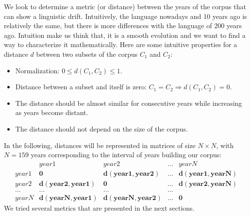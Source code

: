 We look to determine a metric (or distance) between the years of the corpus that can show a linguistic drift. Intuitively, the language nowadays and 10 years ago is relatively the same, but there is more differences with the language of 200 years ago. Intuition make us think that, it is a smooth evolution and we want to find a way to characterize it mathematically. Here are some intuitive properties for a distance $d$ between two subsets of the corpus $C_1$ and $C_2$:

\begin{itemize}
 \item Normalization: $0 \leq d(C_1,C_2) \leq 1$.
 \item Distance between a subset and itself is zero: $C_1 = C_2 \Rightarrow d(C_1,C_2) = 0$.
 \item The distance should be almost similar for consecutive years while increasing as years become distant.
 \item The distance should not depend on the size of the corpus.
\end{itemize}

In the following, distances will be represented in matrices of size $N \times N$, with $N = 159$ years corresponding to the interval of years building our corpus:
\[
\begin{matrix}
 & year1 & year2 & ... & yearN \\
 year1 & \mathbf{0} & \mathbf{d(year1,year2)} & ... & \mathbf{d(year1,yearN)} \\
 year2 & \mathbf{d(year2,year1)} & \mathbf{0} & ... & \mathbf{d(year2,yearN)} \\
 ... & ... & ... & ... \\
 yearN & \mathbf{d(yearN,year1)} & \mathbf{d(yearN,year2)} & ... & \mathbf{0}
\end{matrix}
\]
We tried several metrics that are presented in the next sections.
